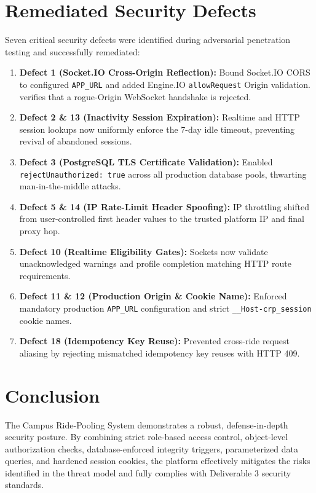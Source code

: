 \documentclass[10pt]{article}
\begin{document}
\section{Remediated Security Defects}
Seven critical security defects were identified during adversarial penetration testing and successfully remediated:
\begin{enumerate}
  \item \textbf{Defect 1 (Socket.IO Cross-Origin Reflection):} Bound Socket.IO CORS to configured \texttt{APP\_URL} and added Engine.IO \texttt{allowRequest} Origin validation.  verifies that a rogue-Origin WebSocket handshake is rejected.
  \item \textbf{Defect 2 \& 13 (Inactivity Session Expiration):} Realtime and HTTP session lookups now uniformly enforce the 7-day idle timeout, preventing revival of abandoned sessions.
  \item \textbf{Defect 3 (PostgreSQL TLS Certificate Validation):} Enabled \texttt{rejectUnauthorized: true} across all production database pools, thwarting man-in-the-middle attacks.
  \item \textbf{Defect 5 \& 14 (IP Rate-Limit Header Spoofing):} IP throttling shifted from user-controlled first header values to the trusted platform IP and final proxy hop.
  \item \textbf{Defect 10 (Realtime Eligibility Gates):} Sockets now validate unacknowledged warnings and profile completion matching HTTP route requirements.
  \item \textbf{Defect 11 \& 12 (Production Origin \& Cookie Name):} Enforced mandatory production \texttt{APP\_URL} configuration and strict \texttt{\_\_Host-crp\_session} cookie names.
  \item \textbf{Defect 18 (Idempotency Key Reuse):} Prevented cross-ride request aliasing by rejecting mismatched idempotency key reuses with HTTP 409.
\end{enumerate}

\section{Conclusion}
The Campus Ride-Pooling System demonstrates a robust, defense-in-depth security posture. By combining strict role-based access control, object-level authorization checks, database-enforced integrity triggers, parameterized data queries, and hardened session cookies, the platform effectively mitigates the risks identified in the threat model and fully complies with Deliverable 3 security standards.
\end{document}

